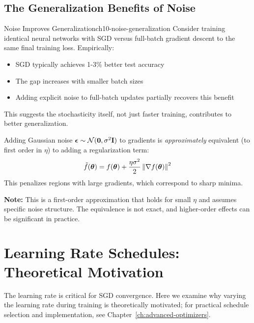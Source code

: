\documentclass[../../main.tex]{subfiles}
\begin{document}
\subsection{The Generalization Benefits of Noise}

\begin{example}{Noise Improves Generalization}{ch10-noise-generalization}
Consider training identical neural networks with SGD versus full-batch gradient descent to the same final training loss. Empirically:
\begin{itemize}
    \item SGD typically achieves 1-3\% better test accuracy
    \item The gap increases with smaller batch sizes
    \item Adding explicit noise to full-batch updates partially recovers this benefit
\end{itemize}
This suggests the stochasticity itself, not just faster training, contributes to better generalization.
\end{example}

\begin{principle}[title=Noise Injection as Approximate Regularization]
Adding Gaussian noise $\boldsymbol{\epsilon} \sim \mathcal{N}(\boldsymbol{0}, \sigma^2 \mathbf{I})$ to gradients is \textit{approximately} equivalent (to first order in $\eta$) to adding a regularization term:
\[
    \tilde{f}(\boldsymbol{\theta}) = f(\boldsymbol{\theta}) + \frac{\eta \sigma^2}{2} \left\lVert \nabla f(\boldsymbol{\theta}) \right\rVert^2
\]
This penalizes regions with large gradients, which correspond to sharp minima.

\textbf{Note:} This is a first-order approximation that holds for small $\eta$ and assumes specific noise structure. The equivalence is not exact, and higher-order effects can be significant in practice.
\end{principle}

\section{Learning Rate Schedules: Theoretical Motivation}
\label{sec:ch10-learning-rate-schedules}

The learning rate is critical for SGD convergence. Here we examine why varying the learning rate during training is theoretically motivated; for practical schedule selection and implementation, see Chapter~\ref{ch:advanced-optimizers}.
\end{document}
